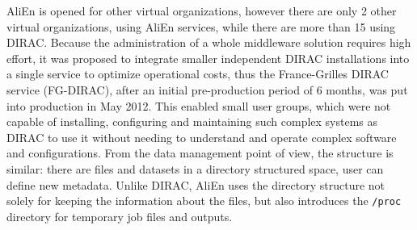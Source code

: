 AliEn is opened for other virtual organizations, however there are only 2 other virtual organizations, using 
AliEn services, while there are more than 15 using DIRAC. Because the administration of a whole middleware 
solution requires high effort, it was proposed to integrate smaller independent DIRAC installations into 
a single service to optimize operational costs, thus the France-Grilles DIRAC service (FG-DIRAC), 
after an initial pre-production period of 6 months, was put into production in May 2012. \cite{FGDIRAC} 
This enabled small user groups, which were not capable of installing, configuring and maintaining  
such complex systems as DIRAC to use it without needing to understand and operate complex software and
configurations. 
From the data management point of view, the 
structure is similar: there are files and datasets in a directory structured space, user can define new metadata.
Unlike DIRAC, AliEn uses the directory structure not solely for keeping the information about the files, 
but also introduces the \texttt{/proc} directory for temporary job files and outputs.